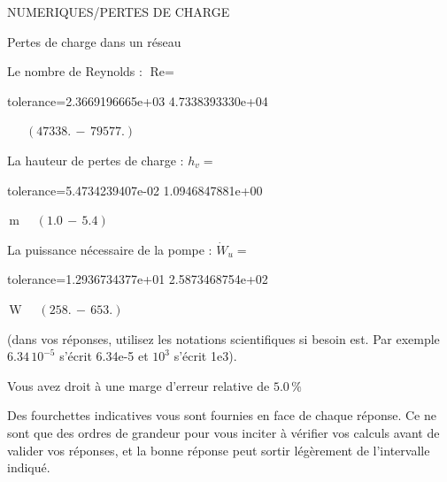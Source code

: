 \documentclass[12pt]{article}
\begin{document}
\begin{quiz}{NUMERIQUES/PERTES DE CHARGE}
\begin{cloze}{Pertes de charge dans un réseau}
 

Le nombre de Reynolds : $\text{Re} =  $
\begin{numerical}[points=1] 
\item[tolerance={2.3669196665e+03}] 4.7338393330e+04 
\end{numerical} 
 $\,$ 
 $ \quad (47338. \, - \, 79577.) $ 

La hauteur de pertes de charge : $h_v =  $
\begin{numerical}[points=1] 
\item[tolerance={5.4734239407e-02}] 1.0946847881e+00 
\end{numerical} 
 $\,  \mathrm{m}$ 
 $ \quad (1.0 \, - \, 5.4) $ 

La puissance nécessaire de la pompe : $\dot{W}_u =  $
\begin{numerical}[points=1] 
\item[tolerance={1.2936734377e+01}] 2.5873468754e+02 
\end{numerical} 
 $\,  \mathrm{W}$ 
 $ \quad (258. \, - \, 653.) $ 

(dans vos réponses, utilisez les notations scientifiques si besoin est. Par exemple $6.34\, 10^{-5}$ s'écrit 6.34e-5 et $10^{3}$ s'écrit 1e3).

Vous avez droit à une marge d'erreur relative de $5.0\, \% $

Des fourchettes indicatives vous sont fournies en face de chaque réponse. Ce ne sont que des ordres de grandeur pour vous inciter à vérifier vos calculs avant de valider vos réponses, et la bonne réponse peut sortir légèrement de l'intervalle indiqué.

\end{cloze} 


\end{quiz}
\end{document}
